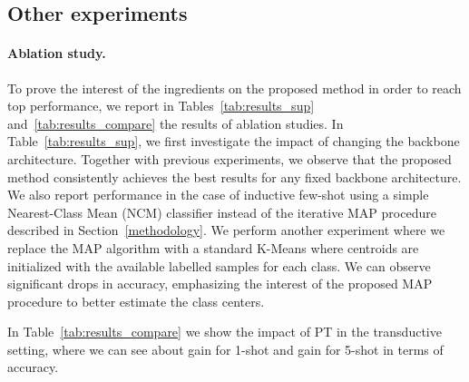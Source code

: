 \documentclass[twoside]{article}
\begin{document}
\subsection{Other experiments}

\paragraph{Ablation study.} To prove the interest of the ingredients on the proposed method in order to reach top performance, we report in Tables~\ref{tab:results_sup} and~\ref{tab:results_compare} the results of ablation studies. In Table~\ref{tab:results_sup}, we first investigate the impact of changing the backbone architecture. Together with previous experiments, we observe that the proposed method consistently achieves the best results for any fixed backbone architecture. We also report performance in the case of inductive few-shot using a simple Nearest-Class Mean (NCM) classifier instead of the iterative MAP procedure described in Section~\ref{methodology}.
We perform another experiment where we replace the MAP algorithm with a standard K-Means where centroids are initialized with the available labelled samples for each class. We can observe significant drops in accuracy, emphasizing the interest of the proposed MAP procedure to better estimate the class centers.

In Table~\ref{tab:results_compare} we show the impact of PT in the transductive setting, where we can see about  gain for 1-shot and  gain for 5-shot in terms of accuracy.
\end{document}
